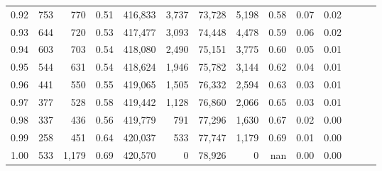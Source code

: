 \begin{tabular}{rrrrrrrrrrrrrr}
0.92 &    753 &    770 &  0.51 &  416,833 &    3,737 &  73,728 &   5,198 &  0.58 &  0.07 &      0.02 \\
0.93 &    644 &    720 &  0.53 &  417,477 &    3,093 &  74,448 &   4,478 &  0.59 &  0.06 &      0.02 \\
0.94 &    603 &    703 &  0.54 &  418,080 &    2,490 &  75,151 &   3,775 &  0.60 &  0.05 &      0.01 \\
0.95 &    544 &    631 &  0.54 &  418,624 &    1,946 &  75,782 &   3,144 &  0.62 &  0.04 &      0.01 \\
0.96 &    441 &    550 &  0.55 &  419,065 &    1,505 &  76,332 &   2,594 &  0.63 &  0.03 &      0.01 \\
0.97 &    377 &    528 &  0.58 &  419,442 &    1,128 &  76,860 &   2,066 &  0.65 &  0.03 &      0.01 \\
0.98 &    337 &    436 &  0.56 &  419,779 &      791 &  77,296 &   1,630 &  0.67 &  0.02 &      0.00 \\
0.99 &    258 &    451 &  0.64 &  420,037 &      533 &  77,747 &   1,179 &  0.69 &  0.01 &      0.00 \\
1.00 &    533 &  1,179 &  0.69 &  420,570 &        0 &  78,926 &       0 &   nan &  0.00 &      0.00 \\
\bottomrule
\end{tabular}
